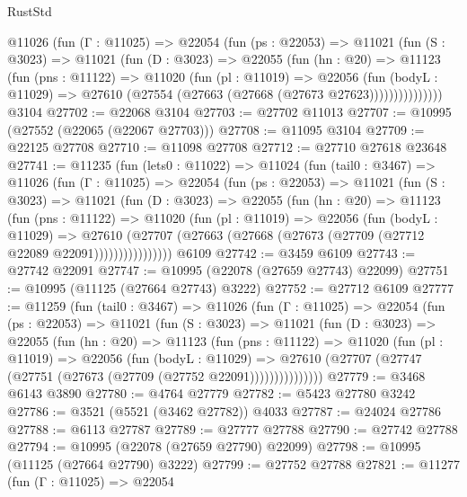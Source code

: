 \begin{lexlean}{RustStd}
\begin{coremodule}
        @11026
          (fun (Γ : @11025) =>
          @22054
            (fun (ps : @22053) =>
            @11021
              (fun (S : @3023) =>
              @11021
                (fun (D : @3023) =>
                @22055
                  (fun (hn : @20) =>
                  @11123
                    (fun (pns : @11122) =>
                    @11020
                      (fun (pl : @11019) =>
                      @22056
                        (fun (bodyL : @11029) =>
                        @27610 (@27554 (@27663 (@27668 (@27673 @27623)))))))))))))))
    @3104
@27702 := @22068 @3104
@27703 := @27702 @11013
@27707 := @10995 (@27552 (@22065 (@22067 @27703)))
@27708 := @11095 @3104
@27709 := @22125 @27708
@27710 := @11098 @27708
@27712 := @27710 @27618 @23648
@27741 := @11235
    (fun (lets0 : @11022) =>
    @11024
      (fun (tail0 : @3467) =>
      @11026
        (fun (Γ : @11025) =>
        @22054
          (fun (ps : @22053) =>
          @11021
            (fun (S : @3023) =>
            @11021
              (fun (D : @3023) =>
              @22055
                (fun (hn : @20) =>
                @11123
                  (fun (pns : @11122) =>
                  @11020
                    (fun (pl : @11019) =>
                    @22056
                      (fun (bodyL : @11029) =>
                      @27610
                        (@27707
                          (@27663 (@27668 (@27673 (@27709 (@27712 @22089 @22091))))))))))))))))
    @6109
@27742 := @3459 @6109
@27743 := @27742 @22091
@27747 := @10995 (@22078 (@27659 @27743) @22099)
@27751 := @10995 (@11125 (@27664 @27743) @3222)
@27752 := @27712 @6109
@27777 := @11259
    (fun (tail0 : @3467) =>
    @11026
      (fun (Γ : @11025) =>
      @22054
        (fun (ps : @22053) =>
        @11021
          (fun (S : @3023) =>
          @11021
            (fun (D : @3023) =>
            @22055
              (fun (hn : @20) =>
              @11123
                (fun (pns : @11122) =>
                @11020
                  (fun (pl : @11019) =>
                  @22056
                    (fun (bodyL : @11029) =>
                    @27610 (@27707 (@27747 (@27751 (@27673 (@27709 (@27752 @22091)))))))))))))))
@27779 := @3468 @6143 @3890
@27780 := @4764 @27779
@27782 := @5423 @27780 @3242
@27786 := @3521 (@5521 (@3462 @27782)) @4033
@27787 := @24024 @27786
@27788 := @6113 @27787
@27789 := @27777 @27788
@27790 := @27742 @27788
@27794 := @10995 (@22078 (@27659 @27790) @22099)
@27798 := @10995 (@11125 (@27664 @27790) @3222)
@27799 := @27752 @27788
@27821 := @11277
    (fun (Γ : @11025) =>
    @22054

\end{coremodule}
\end{lexlean}
